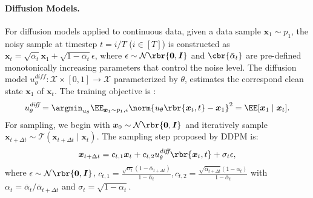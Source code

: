 \paragraph{Diffusion Models.} For diffusion models applied to continuous data, given a data sample $\boldsymbol{x}_1 \sim p_1 $, the noisy sample at timestep $t=i /T$ ($i \in [T]$) is constructed as $\boldsymbol{x}_t = \sqrt{\bar{\alpha}_t}\boldsymbol{x}_1 + \sqrt{1-\bar{\alpha}_t}\epsilon $, where $\epsilon \sim  \mathcal{N}\rbr{\boldsymbol{0}, \boldsymbol{I}}$ and $\cbr{\bar{\alpha}_t} $ are pre-defined monotonically increasing parameters that control the noise level. The diffusion model  $u_\theta^{\textit{diff}}: \mathcal{X}\times [0,1] \to \mathcal{X}$ parameterized by $\theta$, estimates the correspond clean state $\boldsymbol{x}_1$ of $\boldsymbol{x}_t$. The training objective is \citep{ho2020denoising}:
\begin{equation}\label{eq:diffusion train obj}
    u_\theta^{\textit{diff}} = \argmin_{u_\theta} \EE_{\boldsymbol{x}_1 \sim p_1, \epsilon } \norm{ u_\theta\rbr{\boldsymbol{x}_t,t}- \boldsymbol{x}_1 }^2 = \EE[\boldsymbol{x}_1 \mid \boldsymbol{x}_t].
\end{equation}
For sampling, we begin with $\boldsymbol{x}_0 \sim \mathcal{N}\rbr{\boldsymbol{0}, \boldsymbol{I}}$  and iteratively sample $\boldsymbol{x}_{t+\Delta t} \sim \mathcal{T}(\boldsymbol{x}_{t+\Delta t}\mid \boldsymbol{x}_{t})$. The sampling step proposed by DDPM \citep{ho2020denoising} is:
\begin{equation}\label{eq:diffusion ddpm sampling}
    \boldsymbol{x}_{t+\Delta t}  = c_{t,1} \boldsymbol{x}_t + c_{t,2} u_\theta^{\textit{diff}}\rbr{\boldsymbol{x}_t,t}  + \sigma_t \epsilon,
\end{equation}
where $\epsilon \sim \mathcal{N}\rbr{\boldsymbol{0}, \boldsymbol{I}}$, $c_{t,1}= \frac{\sqrt{\alpha_t}(1-\bar{\alpha}_{t+\Delta t})}{1-\bar{\alpha}_t},  c_{t,2} = \frac{\sqrt{\bar{\alpha}_{t+\Delta t}}(1-\alpha_t)}{1-\bar{\alpha}_t}$ with $\alpha_t = \bar{\alpha}_t/\bar{\alpha}_{t+\Delta t}$ and $\sigma_t = \sqrt{1-\alpha_t}$.



